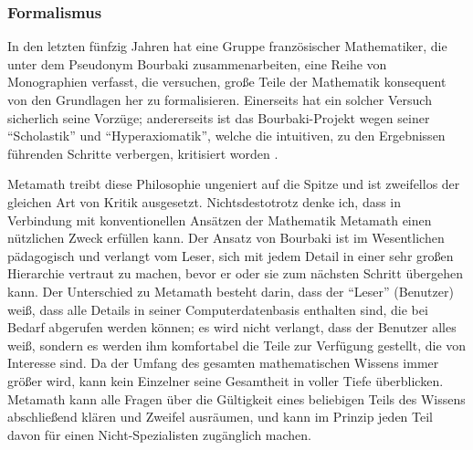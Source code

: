 \subsubsection{Formalismus}

In den letzten fünfzig Jahren hat eine Gruppe französischer Mathematiker, die unter dem Pseudonym Bourbaki zusammenarbeiten, eine Reihe von Monographien verfasst, die versuchen, große Teile der Mathematik konsequent von den Grundlagen her zu formalisieren.  Einerseits hat ein solcher Versuch sicherlich seine Vorzüge; andererseits ist das Bourbaki-Projekt wegen seiner "`Scholastik"' und "`Hyperaxiomatik"', welche die intuitiven, zu den Ergebnissen führenden Schritte verbergen, kritisiert worden \cite[S.~191]{Barrow}.

Metamath treibt diese Philosophie ungeniert auf die Spitze und ist zweifellos der gleichen Art von Kritik ausgesetzt.  Nichtsdestotrotz denke ich, dass in Verbindung mit konventionellen Ansätzen der Mathematik Metamath einen nützlichen Zweck erfüllen kann.  Der Ansatz von Bourbaki ist im Wesentlichen pädagogisch und verlangt vom Leser, sich mit jedem Detail in einer sehr großen Hierarchie vertraut zu machen, bevor er oder sie zum nächsten Schritt übergehen kann.  Der Unterschied zu Metamath besteht darin, dass der "`Leser"' (Benutzer) weiß, dass alle Details in seiner Computerdatenbasis enthalten sind, die bei Bedarf abgerufen werden können; es wird nicht verlangt, dass der Benutzer alles weiß, sondern es werden ihm komfortabel die Teile zur Verfügung gestellt, die von Interesse sind.  Da der Umfang des gesamten mathematischen Wissens immer größer wird, kann kein Einzelner seine Gesamtheit in voller Tiefe überblicken. Metamath kann alle Fragen über die Gültigkeit eines beliebigen Teils des Wissens abschließend klären und Zweifel ausräumen, und kann im Prinzip jeden Teil davon für einen Nicht-Spezialisten zugänglich machen.



